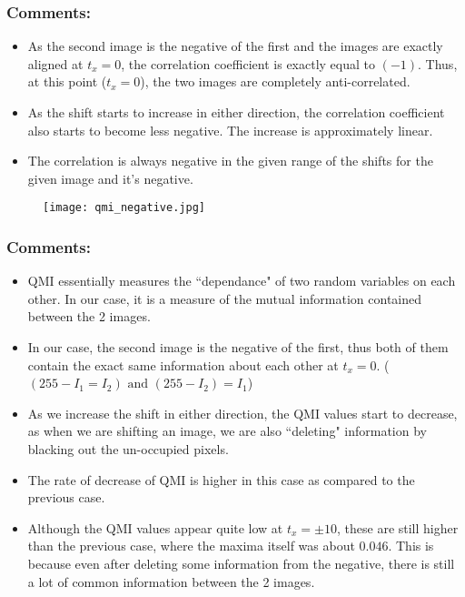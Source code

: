 \documentclass[11pt, fleqn]{article}
\begin{document}
\subsubsection*{Comments:}
\begin{itemize}
    \item As the second image is the negative of the first and the images are exactly aligned at $t_x = 0$, the correlation coefficient is exactly equal to $(-1)$. Thus, at this point ($t_x = 0$), the two images are completely anti-correlated.
    \item As the shift starts to increase in either direction, the correlation coefficient also starts to become less negative. The increase is approximately linear.
    \item The correlation is always negative in the given range of the shifts for the given image and it's negative.
\end{itemize}


\newpage
\begin{figure}[H]
    \centering
    \texttt{[image: qmi\_negative.jpg]}
    \label{q6ic}
\end{figure}

\subsubsection*{Comments:}
\begin{itemize}
    \item QMI essentially measures the ``dependance" of two random variables on each other. In our case, it is a measure of the mutual information contained between the 2 images.
    \item In our case, the second image is the negative of the first, thus both of them contain the exact same information about each other at $t_x = 0.$ ($(255 - I_1 = I_2) \text{ and } (255-I_2) = I_1$)
    \item As we increase the shift in either direction, the QMI values start to decrease, as when we are shifting an image, we are also ``deleting" information by blacking out the un-occupied pixels.
    \item The rate of decrease of QMI is higher in this case as compared to the previous case.
    \item Although the QMI values appear quite low at $t_x = \pm 10$, these are still higher than the previous case, where the maxima itself was about $0.046$. This is because even after deleting some information from the negative, there is still a lot of common information between the 2 images.
\end{itemize}
\end{document}
